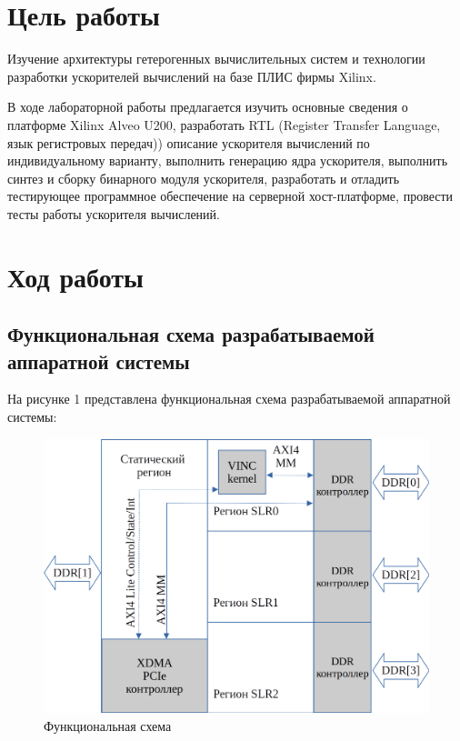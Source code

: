 \chapter*{Цель работы}
Изучение архитектуры гетерогенных вычислительных систем и технологии разработки ускорителей вычислений на базе ПЛИС фирмы Xilinx.

В ходе лабораторной работы предлагается изучить основные сведения о платформе Xilinx Alveo U200, разработать RTL (Register Transfer Language, язык регистровых передач)) описание ускорителя вычислений по индивидуальному варианту, выполнить генерацию ядра ускорителя, выполнить синтез и сборку бинарного модуля ускорителя, разработать и отладить тестирующее программное обеспечение на серверной хост-платформе, провести тесты работы ускорителя вычислений.

\chapter*{Ход работы}

\section*{Функциональная схема разрабатываемой аппаратной системы}

На рисунке 1 представлена функциональная схема разрабатываемой аппаратной системы:
\FloatBarrier
\begin{figure}[h]
	\begin{center}
		\includegraphics[width=\linewidth]{inc/schema.png}
	\end{center}
	\caption{Функциональная схема}
\end{figure}
\FloatBarrier

